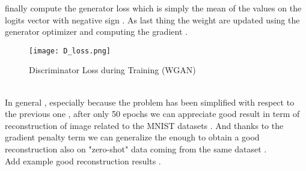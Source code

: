 finally compute the generator loss which is simply the mean of the 
values on the logits vector with negative sign .
As last thing the weight are updated using the generator optimizer 
and computing the gradient .
\\
\begin{figure}[h!]
\texttt{[image: D\_loss.png]}
\caption{Discriminator Loss during Training (WGAN)}
\end{figure}
\\
In general , especially because the problem has been simplified with respect 
to the previous one , after only 50 epochs we can appreciate good result in term of 
reconstruction of image related to the MNIST datasets .
And thanks to the gradient penalty term we can generalize the enough to obtain 
a good reconstruction also on "zero-shot" data coming from the same dataset . 
\\
Add example good reconstruction results .
